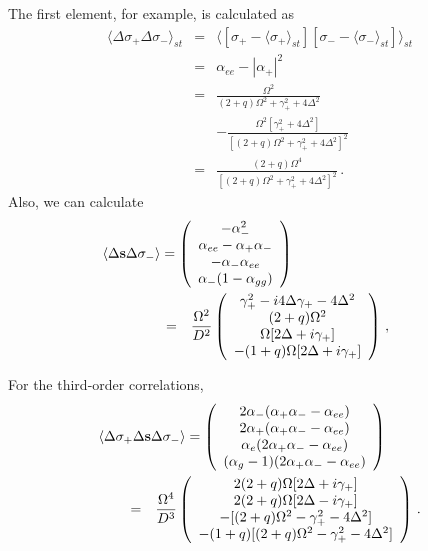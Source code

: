 \documentclass[twocolumn,aps,eqsecnum,showkeys,amsmath]{revtex4-2}
\begin{document}
 The first element, for example, is calculated as 
%
\begin{eqnarray*} 
\langle \Delta \sigma_+ \Delta \sigma_- \rangle_{st} 
	&=& \langle [\sigma_+  - \langle \sigma_+  \rangle_{st}] 
	[\sigma_-  - \langle \sigma_-  \rangle_{st}] \rangle_{st} 	\\ 
	&=& \alpha_{ee} -|\alpha_+|^2 	\\  
&=& \frac{ \Omega^2 }{(2+q)\Omega^2 +\gamma_+^2 +4\Delta^2 }     \\ 
    && -\frac{ \Omega^2[\gamma_+^2 +4\Delta^2] }
    { [(2+q)\Omega^2 +\gamma_+^2 +4\Delta^2 ]^2}  \\ 
&=& \frac{ (2+q)\Omega^4}
    { [(2+q)\Omega^2 +\gamma_+^2 +4\Delta^2 ]^2} \,. 
\end{eqnarray*}
Also, we can calculate 
%
\begin{eqnarray} 	 \label{eq:corre2stb} 
\lefteqn{  \langle \Delta \mathbf{s}  \Delta \sigma_- \rangle = 
\left( \begin{array}{c}  -\alpha_-^2 \\    \alpha_{ee} -\alpha_+ \alpha_- \\   
-\alpha_- \alpha_{ee} \\ \alpha_- (1- \alpha_{gg}) \end{array} 	\right) } 
	\hspace{15mm} 	\\ 
&=& \frac{\Omega^2}{D^2} \left( \begin{array}{c} 
	\gamma_+^2 -i4\Delta \gamma_+ -4\Delta^2 	\\ 
	(2+q) \Omega^2 	\\  	\Omega [2\Delta +i \gamma_+] 	\\
	-(1+q) \Omega [2\Delta +i \gamma_+] 	\end{array} \right) \,,	
	\nonumber	\qquad
\end{eqnarray} 

For the third-order correlations,
%
\begin{eqnarray} 	\label{eq:corre3st}
\lefteqn{   \langle \Delta \sigma_+ \Delta \mathbf{s} 
\Delta \sigma_- \rangle = \left( \begin{array}{c} 
2\alpha_- (\alpha_+ \alpha_- -\alpha_{ee}) \\  
2\alpha_+ (\alpha_+ \alpha_- -\alpha_{ee}) \\ 
\alpha_e (2\alpha_+ \alpha_- -\alpha_{ee}) \\
(\alpha_g -1) (2\alpha_+ \alpha_- -\alpha_{ee}) \end{array}  \right) } 
	\qquad  \\ 
&=&\frac{\Omega^4}{D^3} \left( \begin{array}{c} 
2(2+q) \Omega [2\Delta +i \gamma_+] 	\\
2(2+q) \Omega [2\Delta -i \gamma_+] 	\\ 
-[(2+q) \Omega^2 -\gamma_+^2 -4\Delta^2] 	\\
-(1+q) [(2+q) \Omega^2 -\gamma_+^2 -4\Delta^2]
	\end{array} \right) 		\,.  \nonumber 
\end{eqnarray} 
\end{document}
